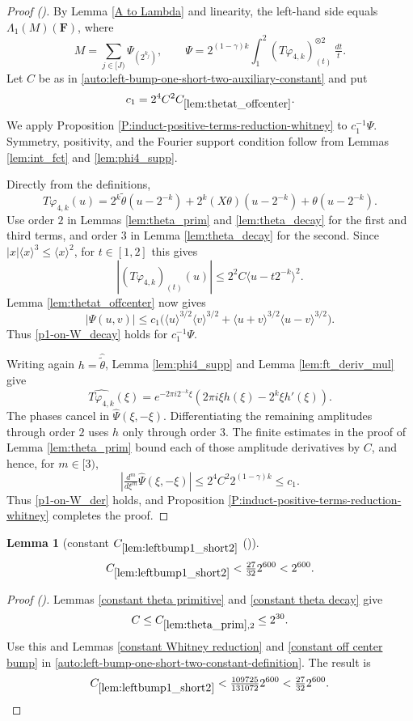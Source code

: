 \documentclass[12pt,reqno]{amsart}
\newcommand{\auto}{{({\tiny\faCar})}}
\theoremstyle{plain}
\newtheorem{lemma}[theorem]{Lemma}
\numberwithin{equation}{section}
\theoremstyle{remark}
\newcommand{\using}[1]{}
\newcommand{\F}{\mathbf{F}}
\begin{document}
\begin{proof}[Proof \auto]
By Lemma \ref{A to Lambda} and linearity, the left-hand side equals $\Lambda_1(M)(\F)$, where
\[
M=\sum_{j\in[J)}\Psi_{(2^{k_j})},
\qquad
\Psi=2^{(1-\gamma)k}\int_1^2(T\varphi_{4,k})_{(t)}^{\otimes2}\,\tfrac{dt}{t}.
\]
Let $C$ be as in \eqref{auto:left-bump-one-short-two-auxiliary-constant} and put
\[
c_1=2^4C^2C_{\ref{lem:thetat_offcenter}}.
\]
We apply Proposition \ref{P:induct-positive-terms-reduction-whitney} to $c_1^{-1}\Psi$. Symmetry, positivity, and the Fourier support condition follow from Lemmas \ref{lem:int_fct} and \ref{lem:phi4_supp}.

Directly from the definitions,
\[
T\varphi_{4,k}(u)
=2^k\widetilde\theta(u-2^{-k})
+2^k(X\theta)(u-2^{-k})
+\theta(u-2^{-k}).
\]
Use order $2$ in Lemmas \ref{lem:theta_prim} and \ref{lem:theta_decay} for the first and third terms, and order $3$ in Lemma \ref{lem:theta_decay} for the second. Since $|x|\langle x\rangle^3\le\langle x\rangle^2$, for $t\in[1,2]$ this gives
\[
|(T\varphi_{4,k})_{(t)}(u)|
\le2^2C\langle u-t2^{-k}\rangle^2.
\]
Lemma \ref{lem:thetat_offcenter} now gives
\[
|\Psi(u,v)|
\le c_1\bigl(
\langle u\rangle^{3/2}\langle v\rangle^{3/2}
+\langle u+v\rangle^{3/2}\langle u-v\rangle^{3/2}
\bigr).
\]
Thus \eqref{p1-on-W_decay} holds for $c_1^{-1}\Psi$.

Writing again $h=\widehat{\widetilde\theta}$, Lemma \ref{lem:phi4_supp} and Lemma \ref{lem:ft_deriv_mul} give
\[
\widehat{T\varphi_{4,k}}(\xi)
=e^{-2\pi i2^{-k}\xi}
\left(2\pi i\xi h(\xi)-2^k\xi h'(\xi)\right).
\]
The phases cancel in $\widehat\Psi(\xi,-\xi)$. Differentiating the remaining amplitudes through order $2$ uses $h$ only through order $3$. The finite estimates in the proof of Lemma \ref{lem:theta_prim} bound each of those amplitude derivatives by $C$, and hence, for $m\in[3)$,
\[
\left|\tfrac{d^m}{d\xi^m}\widehat\Psi(\xi,-\xi)\right|
\le2^4C^2 2^{(1-\gamma)k}
\le c_1.
\]
Thus \eqref{p1-on-W_der} holds, and Proposition \ref{P:induct-positive-terms-reduction-whitney} completes the proof.
\end{proof}

\begin{lemma}[constant $C_{\ref{lem:leftbump1_short2}}$ \auto]\label{constant left bump one short two}\using{lem:theta_prim}\using{constant theta primitive}\using{constant theta decay}\using{constant Whitney reduction}\using{constant off center bump}\using{lem:leftbump1_short2}
\begin{equation}\label{constant left bump one short two bound}
C_{\ref{lem:leftbump1_short2}}<\tfrac{27}{32}2^{600}<2^{600}.
\end{equation}
\end{lemma}
\begin{proof}[Proof \auto]
Lemmas \ref{constant theta primitive} and \ref{constant theta decay} give
\[
C\le C_{\ref{lem:theta_prim},2}\le2^{30}.
\]
Use this and Lemmas \ref{constant Whitney reduction} and \ref{constant off center bump} in \eqref{auto:left-bump-one-short-two-constant-definition}. The result is
\[
C_{\ref{lem:leftbump1_short2}}
<\tfrac{109725}{131072}2^{600}
<\tfrac{27}{32}2^{600}.
\]
\end{proof}
\end{document}
